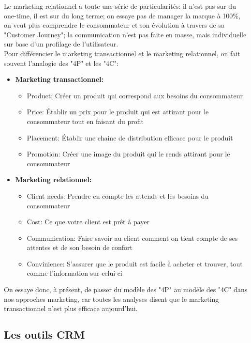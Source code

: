 Le marketing relationnel a toute une série de particularités: il n'est pas sur du one-time, il est sur du long terme; on essaye pas de manager la marque à 100\%, on veut plus comprendre le consommateur et son évolution à travers de sa "Customer Journey"; la communication n'est pas faite en masse, mais individuelle sur base d'un profilage de l'utilisateur. \\

Pour différencier le marketing transactionnel et le marketing relationnel, on fait souvent l'analogie des "4P" et les "4C":

\begin{itemize}
    \item \textbf{Marketing transactionnel:}
    \begin{itemize}
        \item Product: Créer un produit qui correspond aux besoins du consommateur
        \item Price: Établir un prix pour le produit qui est attirant pour le consommateur tout en faisant du profit
        \item Placement: Établir une chaine de distribution efficace pour le produit
        \item Promotion: Créer une image du produit qui le rends attirant pour le consommateur
    \end{itemize}
    \item \textbf{Marketing relationnel:}
    \begin{itemize}
        \item Client needs: Prendre en compte les attends et les besoins du consommateur
        \item Cost: Ce que votre client est prêt à payer
        \item Communication: Faire savoir au client comment on tient compte de ses attentes et de son besoin de confort
        \item Convinience: S'assurer que le produit est facile à acheter et trouver, tout comme l'information sur celui-ci\\
    \end{itemize}
\end{itemize}

On essaye donc, à présent, de passer du modèle des "4P" au modèle des "4C" dans nos approches marketing, car toutes les analyses disent que le marketing transactionnel n'est plus efficace aujourd'hui.\\

\subsection{Les outils CRM}

